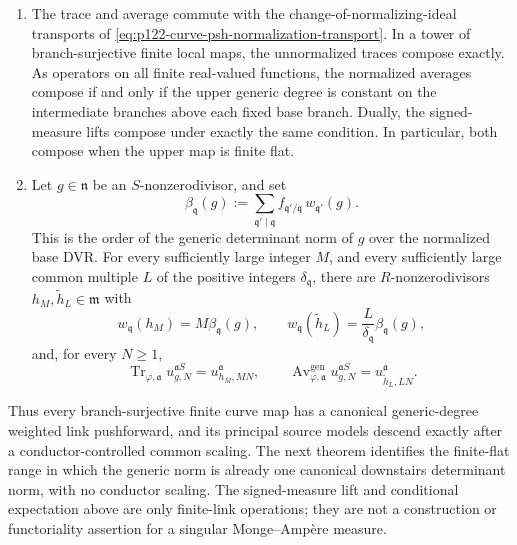 \begin{theorem}
\begin{enumerate}
\[\begin{split}
          \sum_{\mathfrak q'\mid\mathfrak q}
          \frac{e_{\mathfrak q'/\mathfrak q}
                    f_{\mathfrak q'/\mathfrak q}}
               {\delta_{\mathfrak q}}
          \left|u(v_{\mathfrak q'}^{\mathfrak aS})
             -(\operatorname{Av}^{\mathrm{gen}}_{\varphi,\mathfrak a}u)
                (v_{\mathfrak q}^{\mathfrak a})\right|^2.
       \end{split}
       \tag{\(\mathrm{Var}\)}
       \label{eq:p126-curve-generic-variance}
      \]
\item The trace and average commute with the change-of-normalizing-ideal
      transports of
      \eqref{eq:p122-curve-psh-normalization-transport}.  In a tower of
      branch-surjective finite local maps, the unnormalized traces compose
      exactly.  As operators on all finite real-valued functions, the
      normalized averages compose if and only if the upper generic degree is
      constant on the intermediate branches above each fixed base branch.
      Dually, the signed-measure lifts compose under exactly the same
      condition.  In particular, both compose when the upper map is finite
      flat.
\item Let \(g\in\mathfrak n\) be an \(S\)-nonzerodivisor, and set
      \[
       \beta_{\mathfrak q}(g)
          :=\sum_{\mathfrak q'\mid\mathfrak q}
             f_{\mathfrak q'/\mathfrak q}\,
             w_{\mathfrak q'}(g).
       \tag{\(\blacktriangleleft\blacktriangleleft\)}
       \label{eq:p126-curve-generic-norm-order}
      \]
      This is the order of the generic determinant norm of \(g\) over the
      normalized base DVR.  For every sufficiently large integer \(M\), and
      every sufficiently large common multiple \(L\) of the positive
      integers \(\delta_{\mathfrak q}\), there are
      \(R\)-nonzerodivisors \(h_M,\widetilde h_L\in\mathfrak m\) with
      \[
       w_{\mathfrak q}(h_M)=M\beta_{\mathfrak q}(g),
       \qquad
       w_{\mathfrak q}(\widetilde h_L)
          =\frac{L}{\delta_{\mathfrak q}}\beta_{\mathfrak q}(g),
      \]
      and, for every \(N\geq1\),
      \[
       \operatorname{Tr}_{\varphi,\mathfrak a}
          u^{\mathfrak aS}_{g,N}
          =u^{\mathfrak a}_{h_M,MN},
       \qquad
       \operatorname{Av}^{\mathrm{gen}}_{\varphi,\mathfrak a}
          u^{\mathfrak aS}_{g,N}
          =u^{\mathfrak a}_{\widetilde h_L,LN}.
       \tag{\(\blacklozenge\blacklozenge\)}
       \label{eq:p126-curve-generic-principal-descent}
      \]
\end{enumerate}
Thus every branch-surjective finite curve map has a canonical generic-degree
weighted link pushforward, and its principal source models descend exactly
after a conductor-controlled common scaling.  The next theorem identifies
the finite-flat range in which the generic norm is already one canonical
downstairs determinant norm, with no conductor scaling.  The signed-measure
lift and conditional expectation above are only finite-link operations;
they are not a construction or functoriality assertion for a singular
Monge--Amp\`ere measure.
\end{theorem}

